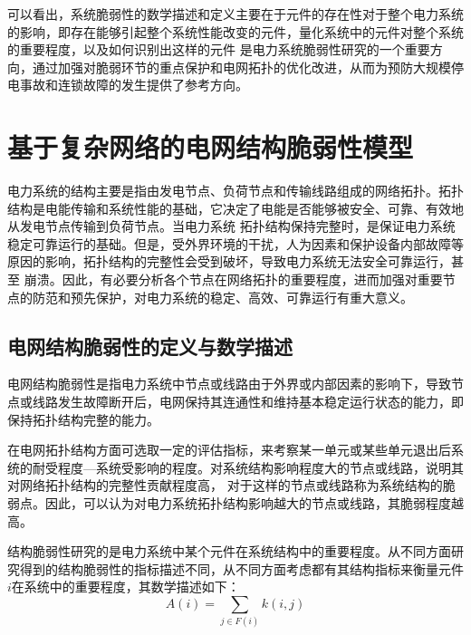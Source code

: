 
可以看出，系统脆弱性的数学描述和定义主要在于元件的存在性对于整个电力系统的影响，即存在能够引起整个系统性能改变的元件，量化系统中的元件对整个系统的重要程度，以及如何识别出这样的元件
是电力系统脆弱性研究的一个重要方向，通过加强对脆弱环节的重点保护和电网拓扑的优化改进，从而为预防大规模停电事故和连锁故障的发生提供了参考方向。


\section{基于复杂网络的电网结构脆弱性模型}
\label{sec:construction}

电力系统的结构主要是指由发电节点、负荷节点和传输线路组成的网络拓扑。拓扑结构是电能传输和系统性能的基础，它决定了电能是否能够被安全、可靠、有效地从发电节点传输到负荷节点。当电力系统
拓扑结构保持完整时，是保证电力系统稳定可靠运行的基础。但是，受外界环境的干扰，人为因素和保护设备内部故障等原因的影响，拓扑结构的完整性会受到破坏，导致电力系统无法安全可靠运行，甚至
崩溃。因此，有必要分析各个节点在网络拓扑的重要程度，进而加强对重要节点的防范和预先保护，对电力系统的稳定、高效、可靠运行有重大意义。

\subsection{电网结构脆弱性的定义与数学描述}
\label{sec:network}

电网结构脆弱性是指电力系统中节点或线路由于外界或内部因素的影响下，导致节点或线路发生故障断开后，电网保持其连通性和维持基本稳定运行状态的能力，即保持拓扑结构完整的能力。

在电网拓扑结构方面可选取一定的评估指标，来考察某一单元或某些单元退出后系统的耐受程度—系统受影响的程度。对系统结构影响程度大的节点或线路，说明其对网络拓扑结构的完整性贡献程度高，
对于这样的节点或线路称为系统结构的脆弱点。因此，可以认为对电力系统拓扑结构影响越大的节点或线路，其脆弱程度越高。

结构脆弱性研究的是电力系统中某个元件在系统结构中的重要程度。从不同方面研究得到的结构脆弱性的指标描述不同，从不同方面考虑都有其结构指标来衡量元件$i$在系统中的重要程度，其数学描述如下：
\begin{equation}
  \label{equ:chap3:math2}
  A(i)=\sum_{j\in F(i)}{k(i,j)}
\end{equation}

